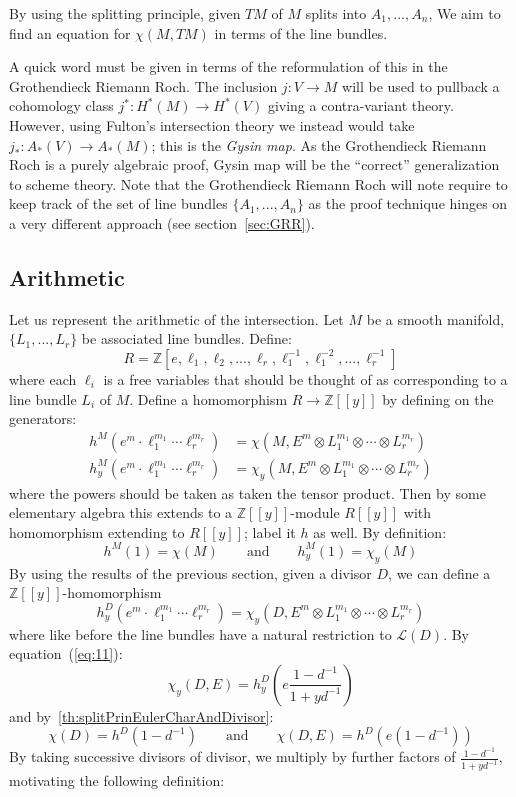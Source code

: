\documentclass{ut-thesis}
\newcommand{\Z}{{\mathbb{Z}}}
\newcommand{\CL}{{\mathcal{L}}}
\begin{document}
By using the splitting principle, given $TM$ of $M$ splits into $A_1, ..., A_n$, We aim to find an equation
for $\chi(M, TM)$ in terms of the line bundles.

A quick word must be given in terms of the reformulation of this in the Grothendieck Riemann Roch. The
inclusion $j: V \to M$ will be used to pullback a cohomology class $j^*: H^*(M) \to H^*(V)$ giving
a contra-variant theory. However, using Fulton's intersection theory we instead would take $j_*: A_*(V) \to
A_*(M)$; this is the \emph{Gysin map}. As the Grothendieck Riemann Roch is a purely algebraic proof, Gysin map
will be the ``correct'' generalization to scheme theory. Note that the Grothendieck Riemann Roch will note
require to keep track of the set of line bundles $\{A_1, ..., A_n\}$ as the proof technique hinges on
a very different approach (see section~\ref{sec:GRR}).

%

\subsection{Arithmetic}

Let us represent the arithmetic of the intersection. Let $M$ be a smooth manifold, $\{L_1, ..., L_r\}$ be
associated line bundles. Define:
\[
  R = \Z[e, \ell_1, \ell_2, ..., \ell_r, \ell_1^{-1}, \ell_1^{-2}, ...,\ell_r^{-1}]
\]
where each $\ell_i$ is a free variables that should be thought of as corresponding to a line bundle $L_i$ of
$M$. Define a homomorphism $R \to \Z[[y]]$ by defining on the generators:
\begin{align*}
  h^M(e^{m}\cdot \ell_1^{m_1}\cdots \ell_r^{m_r}) &= \chi(M, E^{m} \otimes L_1^{m_1}\otimes \cdots \otimes L_r^{m_r})\\
  h_y^M(e^{m}\cdot \ell_1^{m_1}\cdots \ell_r^{m_r}) &= \chi_y(M, E^{m} \otimes L_1^{m_1}\otimes \cdots \otimes L_r^{m_r})
\end{align*}
where the powers should be taken as taken the tensor product. Then by some elementary algebra this extends to
a $\Z[[y]]$-module $R[[y]]$ with homomorphism extending to $R[[y]]$; label it $h$ as well. By definition:
\[
  h^M(1) = \chi(M) \qquad \text{and} \qquad h_y^M(1) = \chi_y(M)
\]
By using the results of the previous section, given a divisor $D$, we can define a $\Z[[y]]$-homomorphism
\[
  h_y^D(e^{m}\cdot \ell_1^{m_1}\cdots \ell_r^{m_r}) = \chi_y(D, E^{m} \otimes L_1^{m_1}\otimes \cdots \otimes
  L_r^{m_r})
\]
where like before the line bundles have a natural restriction to $\CL(D)$. By equation~(\ref{eq:11}):
\[
  \chi_y(D, E) = h_y^D \left(e\frac{1-d^{-1}}{1+yd^{-1}}\right)
\]
and by~\cref{th:splitPrinEulerCharAndDivisor}:
\[
  \chi(D) = h^D(1-d^{-1}) \qquad \text{and} \qquad \chi(D, E) = h^D(e(1- d^{-1}))
\]
By taking successive divisors of divisor, we multiply by further factors of $\frac{1-d^{-1}}{1+yd^{-1}}$,
motivating the following definition:
\end{document}
